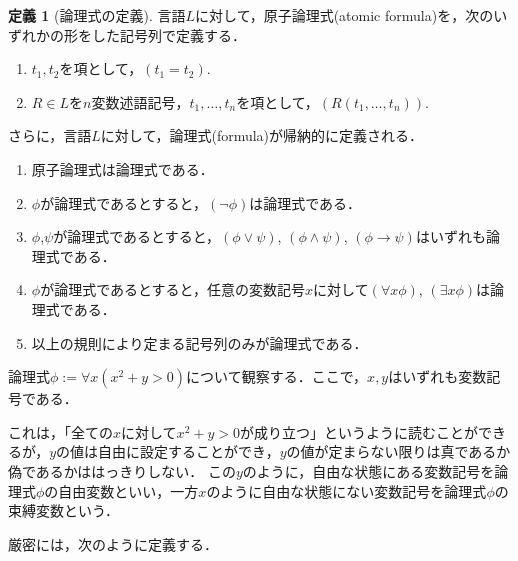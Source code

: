\documentclass[uplatex, dvipdfmx]{jsarticle}
\theoremstyle{definition}
\newtheorem{definition}{定義}[section]
\begin{document}
\begin{definition}[論理式の定義]
     言語$L$に対して，原子論理式(atomic formula)を，次のいずれかの形をした記号列で定義する．
     \begin{enumerate}
          \item $t_1, t_2$を項として，$(t_1=t_2)$.
          \item $R \in L$を$n$変数述語記号，$t_1, \dots, t_n$を項として，$(R(t_1, \dots, t_n))$.
     \end{enumerate}
     
     さらに，言語$L$に対して，論理式(formula)が帰納的に定義される．
     \begin{enumerate}
          \item 原子論理式は論理式である．
          \item $\phi$が論理式であるとすると，$(\lnot \phi)$は論理式である．
          \item $\phi$,$\psi$が論理式であるとすると，$(\phi \lor \psi)$, $(\phi \land \psi)$, $(\phi \rightarrow \psi)$はいずれも論理式である．
          \item $\phi$が論理式であるとすると，任意の変数記号$x$に対して$(\forall x \phi)$, $(\exists x \phi)$は論理式である．
          \item 以上の規則により定まる記号列のみが論理式である．
     \end{enumerate}
\end{definition}

論理式$\phi := \forall x (x^2 + y > 0)$について観察する．ここで，$x,y$はいずれも変数記号である．

これは，「全ての$x$に対して$x^2 + y > 0$が成り立つ」というように読むことができるが，$y$の値は自由に設定することができ，$y$の値が定まらない限りは真であるか偽であるかははっきりしない．
この$y$のように，自由な状態にある変数記号を論理式$\phi$の自由変数といい，一方$x$のように自由な状態にない変数記号を論理式$\phi$の束縛変数という．

厳密には，次のように定義する．
\end{document}
